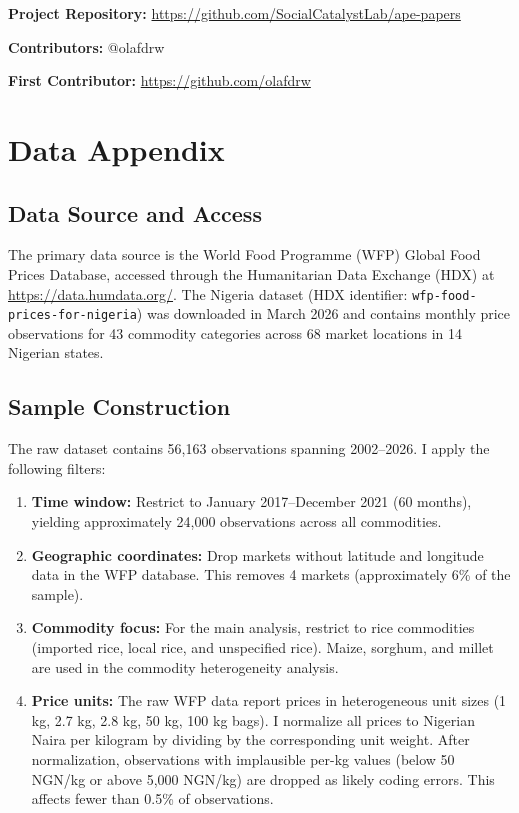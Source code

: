 \documentclass[12pt]{article}
\begin{document}
\noindent\textbf{Project Repository:} \url{https://github.com/SocialCatalystLab/ape-papers}

\noindent\textbf{Contributors:} @olafdrw

\noindent\textbf{First Contributor:} \url{https://github.com/olafdrw}


\label{apep_main_text_end}
\newpage


\newpage
\appendix

\section{Data Appendix}
\label{app:data}

\subsection{Data Source and Access}

The primary data source is the World Food Programme (WFP) Global Food Prices Database, accessed through the Humanitarian Data Exchange (HDX) at \url{https://data.humdata.org/}. The Nigeria dataset (HDX identifier: \texttt{wfp-food-prices-for-nigeria}) was downloaded in March 2026 and contains monthly price observations for 43 commodity categories across 68 market locations in 14 Nigerian states.

\subsection{Sample Construction}

The raw dataset contains 56,163 observations spanning 2002--2026. I apply the following filters:

\begin{enumerate}
    \item \textbf{Time window:} Restrict to January 2017--December 2021 (60 months), yielding approximately 24,000 observations across all commodities.
    \item \textbf{Geographic coordinates:} Drop markets without latitude and longitude data in the WFP database. This removes 4 markets (approximately 6\% of the sample).
    \item \textbf{Commodity focus:} For the main analysis, restrict to rice commodities (imported rice, local rice, and unspecified rice). Maize, sorghum, and millet are used in the commodity heterogeneity analysis.
    \item \textbf{Price units:} The raw WFP data report prices in heterogeneous unit sizes (1 kg, 2.7 kg, 2.8 kg, 50 kg, 100 kg bags). I normalize all prices to Nigerian Naira per kilogram by dividing by the corresponding unit weight. After normalization, observations with implausible per-kg values (below 50 NGN/kg or above 5,000 NGN/kg) are dropped as likely coding errors. This affects fewer than 0.5\% of observations.
\end{enumerate}
\end{document}
